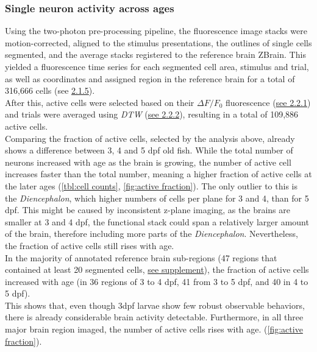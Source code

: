\documentclass[12pt, a4paper, oneside]{article}
\begin{document}
\subsubsection{Single neuron activity across ages}
\label{sec:activity ages}
Using the two-photon pre-processing pipeline, the fluorescence image stacks were motion-corrected, aligned to the stimulus presentations, the outlines of single cells segmented, and the average stacks registered to the reference brain ZBrain. This yielded a fluorescence time series for each segmented cell area, stimulus and trial, as well as coordinates and assigned region in the reference brain for a total of 316,666 cells (see \hyperref[sec:image preproc]{2.1.5}).\\
After this, active cells were selected based on their $\Delta F/F_{0}$ fluorescence (\hyperref[sec:activity detection]{see 2.2.1}) and trials were averaged using \textit{DTW} (\hyperref[sec:dtw trials]{see 2.2.2}), resulting in a total of 109,886 active cells.\\
Comparing the fraction of active cells, selected by the analysis above, already shows a difference between 3, 4 and 5 dpf old fish. While the total number of neurons increased with age as the brain is growing, the number of active cell increases faster than the total number, meaning a higher fraction of active cells at the later ages (\autoref{tbl:cell counts}, \autoref{fig:active fraction}). The only outlier to this is the \textit{Diencephalon}, which higher numbers of cells per plane for 3 and 4, than for 5 dpf. This  might be caused by inconsistent z-plane imaging, as the brains are smaller at 3 and 4 dpf, the functional stack could span a relatively larger amount of the brain, therefore including more parts of the \textit{Diencephalon}. Nevertheless, the fraction of active cells still rises with age.\\
In the majority of annotated reference brain sub-regions (47 regions that contained at least 20 segmented cells, \hyperref[sec:list of regions]{see supplement}), the fraction of active cells increased with age (in 36 regions of 3 to 4 dpf, 41 from 3 to 5 dpf, and 40 in 4 to 5 dpf).\\
This shows that, even though 3dpf larvae show few robust observable behaviors, there is already considerable brain activity detectable. Furthermore, in all three major brain region imaged, the number of active cells rises with age. (\autoref{fig:active fraction}).\\
\end{document}
